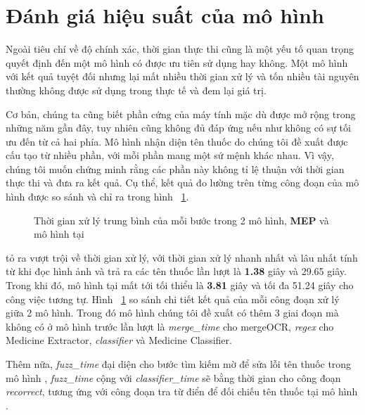 \section{Đánh giá hiệu suất của mô hình}

Ngoài tiêu chí về độ chính xác, thời gian thực thi cũng là một yếu tố quan trọng quyết định đến một mô hình có được ưu tiên sử dụng hay không. Một mô hình với kết quả tuyệt đối nhưng lại mất nhiều thời gian xử lý và tốn nhiều tài nguyên thường không được sử dụng trong thực tế và đem lại giá trị.

Cơ bản, chúng ta cũng biết phần cứng của máy tính mặc dù được mở rộng trong những năm gần đây, tuy nhiên cũng không đủ đáp ứng nếu như không có sự tối ưu đến từ cả hai phía. Mô hình nhận diện tên thuốc do chúng tôi đề xuất được cấu tạo từ nhiều phần, với mỗi phần mang một sứ mệnh khác nhau. Vì vậy, chúng tôi muốn chứng minh rằng các phần này không tỉ lệ thuận với thời gian thực thi và đưa ra kết quả. Cụ thể, kết quả đo lường trên từng công đoạn của mô hình được so sánh và chỉ ra trong hình ~\ref{exp:barchart}.

\begin{figure}
\centering
\scalebox{0.65}{}
\caption{Thời gian xử lý trung bình của mỗi bước trong 2 mô hình, \textbf{MEP} và mô hình tại \cite{nguyen2021developing}}\label{exp:barchart}
\end{figure}

 tỏ ra vượt trội về thời gian xử lý, với thời gian xử lý nhanh nhất và lâu nhất tính từ khi đọc hình ảnh và trả ra các tên thuốc lần lượt là \textbf{1.38} giây và 29.65 giây. Trong khi đó, mô hình tại \cite{nguyen2021developing} mất tới tối thiểu là \textbf{3.81} giây và tối đa 51.24 giây cho công việc tương tự. Hình ~\ref{exp:barchart} so sánh chi tiết kết quả của mỗi công đoạn xử lý giữa 2 mô hình. Trong đó mô hình chúng tôi đề xuất có thêm 3 giai đoạn mà không có ở mô hình trước lần lượt là \textit{merge_time} cho mergeOCR, \textit{regex} cho Medicine Extractor, \textit{classifier} và Medicine Classifier. 

Thêm nữa, \textit{fuzz_time} đại diện cho bước tìm kiếm mờ để sửa lỗi tên thuốc trong mô hình , \textit{fuzz_time} cộng với \textit{classifier_time} sẽ bằng thời gian cho công đoạn \textit{recorrect}, tương ứng với công đoạn tra từ điển để đối chiếu tên thuốc tại mô hình \cite{nguyen2021developing}.

